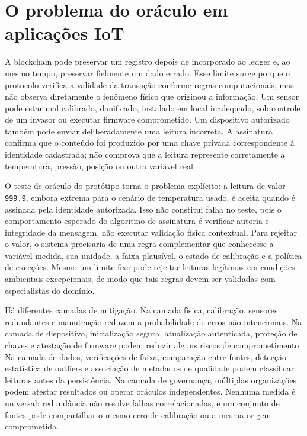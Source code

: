 \documentclass[10pt,a4paper,twocolumn]{article}
\begin{document}
\section{O problema do oráculo em aplicações IoT}
A blockchain pode preservar um registro depois de incorporado ao ledger e, ao mesmo tempo, preservar fielmente um dado errado. Esse limite surge porque o protocolo verifica a validade da transação conforme regras computacionais, mas não observa diretamente o fenômeno físico que originou a informação. Um sensor pode estar mal calibrado, danificado, instalado em local inadequado, sob controle de um invasor ou executar firmware comprometido. Um dispositivo autorizado também pode enviar deliberadamente uma leitura incorreta. A assinatura confirma que o conteúdo foi produzido por uma chave privada correspondente à identidade cadastrada; não comprova que a leitura represente corretamente a temperatura, pressão, posição ou outra variável real \cite{Christidis2016,Yaga2018}.

O teste de oráculo do protótipo torna o problema explícito: a leitura de valor \texttt{999.9}, embora extrema para o cenário de temperatura usado, é aceita quando é assinada pela identidade autorizada. Isso não constitui falha no teste, pois o comportamento esperado do algoritmo de assinatura é verificar autoria e integridade da mensagem, não executar validação física contextual. Para rejeitar o valor, o sistema precisaria de uma regra complementar que conhecesse a variável medida, sua unidade, a faixa plausível, o estado de calibração e a política de exceções. Mesmo um limite fixo pode rejeitar leituras legítimas em condições ambientais excepcionais, de modo que tais regras devem ser validadas com especialistas do domínio.

Há diferentes camadas de mitigação. Na camada física, calibração, sensores redundantes e manutenção reduzem a probabilidade de erros não intencionais. Na camada de dispositivo, inicialização segura, atualização autenticada, proteção de chaves e atestação de firmware podem reduzir alguns riscos de comprometimento. Na camada de dados, verificações de faixa, comparação entre fontes, detecção estatística de outliers e associação de metadados de qualidade podem classificar leituras antes da persistência. Na camada de governança, múltiplas organizações podem atestar resultados ou operar oráculos independentes. Nenhuma medida é universal: redundância não resolve falhas correlacionadas, e um conjunto de fontes pode compartilhar o mesmo erro de calibração ou a mesma origem comprometida.
\end{document}
